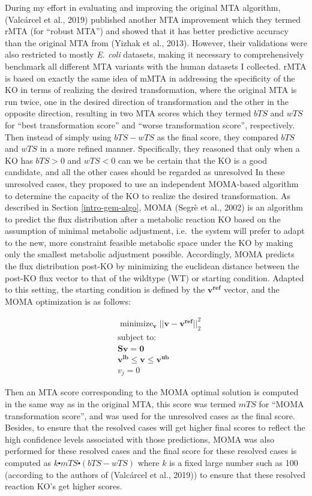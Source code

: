 \documentclass[12pt,twoside,openany,\mydriver]{thesis}  %
\DeclareMathOperator*{\minimize}{minimize}
\begin{document}
During my effort in evaluating and improving the original MTA algorithm, (Valcárcel et al., 2019) published another MTA improvement which they termed rMTA (for ``robust MTA'') and showed that it has better predictive accuracy than the original MTA from (Yizhak et al., 2013). However, their validations were also restricted to mostly \emph{E. coli} datasets, making it necessary to comprehensively benchmark all different MTA variants with the human datasets I collected. rMTA is based on exactly the same idea of mMTA in addressing the specificity of the KO in terms of realizing the desired transformation, where the original MTA is run twice, one in the desired direction of transformation and the other in the opposite direction, resulting in two MTA scores which they termed \(bTS\) and \(wTS\) for ``best transformation score'' and ``worse transformation score'', respectively. Then instead of simply using \(bTS - wTS\) as the final score, they compared \(bTS\) and \(wTS\) in a more refined manner. Specifically, they reasoned that only when a KO has \(bTS>0\) and \(wTS<0\) can we be certain that the KO is a good candidate, and all the other cases should be regarded as unresolved In these unresolved cases, they proposed to use an independent MOMA-based algorithm to determine the capacity of the KO to realize the desired transformation. As described in Section \ref{intro-gem-algo}, MOMA (Segrè et al., 2002) is an algorithm to predict the flux distribution after a metabolic reaction KO based on the assumption of minimal metabolic adjustment, i.e.~the system will prefer to adapt to the new, more constraint feasible metabolic space under the KO by making only the smallest metabolic adjustment possible. Accordingly, MOMA predicts the flux distribution post-KO by minimizing the euclidean distance between the post-KO flux vector to that of the wildtype (WT) or starting condition. Adapted to this setting, the starting condition is defined by the \(\mathbf{v^{ref}}\) vector, and the MOMA optimization is as follows:

\[
\begin{aligned}
&\minimize_{\mathbf{v}} ||\mathbf{v}-\mathbf{v^{ref}}||_2^2 \\
&\text{subject to:} \\
&\mathbf{Sv = 0} \\
&\mathbf{v^{lb} \le v \le v^{ub}} \\
&v_{j} = 0
\end{aligned}
\]

Then an MTA score corresponding to the MOMA optimal solution is computed in the same way as in the original MTA, this score was termed \(mTS\) for ``MOMA transformation score'', and was used for the unresolved cases as the final score. Besides, to ensure that the resolved cases will get higher final scores to reflect the high confidence levels associated with those predictions, MOMA was also performed for these resolved cases and the final score for these resolved cases is computed as \(k\centerdot mTS \centerdot (bTS-wTS)\) where \(k\) is a fixed large number such as 100 (according to the authors of (Valcárcel et al., 2019)) to ensure that these resolved reaction KO's get higher scores.
\end{document}
